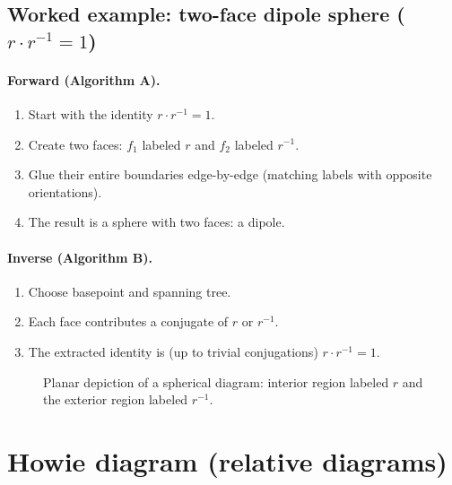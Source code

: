\documentclass[11pt]{article}
\theoremstyle{definition}
\theoremstyle{plain}
\theoremstyle{remark}
\begin{document}
\subsection*{Worked example: two-face dipole sphere ($r\cdot r^{-1}=1$)}
\paragraph{Forward (Algorithm A).}
\begin{enumerate}[leftmargin=2.2em]
\item Start with the identity $r\cdot r^{-1}=1$.
\item Create two faces: $f_1$ labeled $r$ and $f_2$ labeled $r^{-1}$.
\item Glue their entire boundaries edge-by-edge (matching labels with opposite orientations).
\item The result is a sphere with two faces: a dipole.
\end{enumerate}

\paragraph{Inverse (Algorithm B).}
\begin{enumerate}[leftmargin=2.2em]
\item Choose basepoint and spanning tree.
\item Each face contributes a conjugate of $r$ or $r^{-1}$.
\item The extracted identity is (up to trivial conjugations) $r\cdot r^{-1}=1$.
\end{enumerate}

\begin{figure}[h]
\centering
{}
\caption{Planar depiction of a spherical diagram: interior region labeled $r$ and the exterior region labeled $r^{-1}$.}
\end{figure}
\clearpage
\section{Howie diagram (relative diagrams)}
\end{document}
